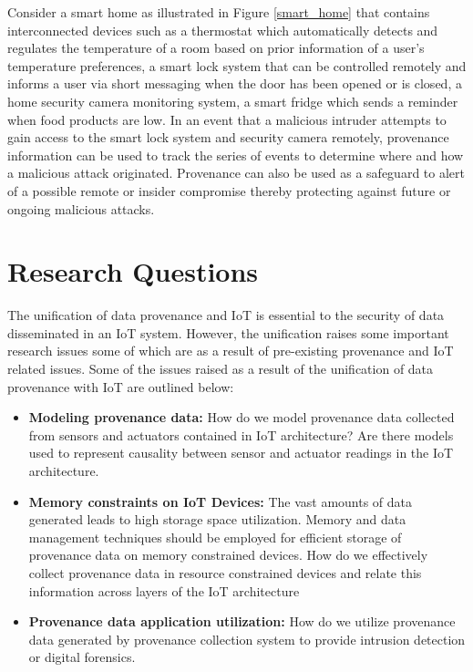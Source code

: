 Consider a smart home as illustrated in Figure \ref{smart_home} that contains interconnected devices such as a thermostat which automatically detects and regulates the temperature of a room based on prior information of a user's temperature preferences, a smart lock system that can be controlled remotely and informs a user via short messaging when the door has been opened or is closed, a home security camera monitoring system, a smart fridge which sends a reminder when food products are low. In an event that a malicious intruder attempts  to gain access to the smart lock system and security camera remotely, provenance information can be used to track the series  of events to determine where and how a malicious attack originated. Provenance can also be used as a safeguard to alert of a possible remote or insider compromise thereby protecting against future or ongoing malicious attacks. 





\section{Research Questions}
The unification of data provenance and IoT is essential to the security of data disseminated in an IoT system. However, the unification raises some important research issues some of which are as a result of pre-existing provenance and IoT related issues. Some of the issues raised as a result of the unification of data provenance with IoT are outlined below:

\begin{itemize}

\item \textbf{Modeling provenance data:} How do we model provenance data collected from sensors and actuators contained in IoT architecture? Are there models used to represent causality between sensor and actuator readings in the IoT architecture.

\item \textbf{Memory constraints on IoT Devices:} The vast amounts of data generated leads to high storage space utilization. Memory and data management techniques should be employed for efficient storage of provenance data on memory constrained devices. How do we effectively collect provenance data in resource constrained devices and relate this information across layers of the IoT architecture



\item \textbf{Provenance data application utilization:} How do we utilize provenance data generated by provenance collection system to provide intrusion detection or digital forensics.



\end{itemize}

